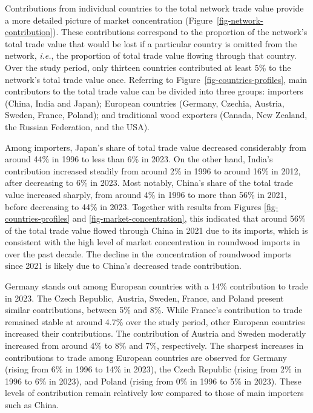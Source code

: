 \documentclass[
  authoryear,
  review,
  3p]{elsarticle}
\begin{document}
Contributions from individual countries to the total network trade value
provide a more detailed picture of market concentration
(Figure~\ref{fig-network-contribution}). These contributions correspond
to the proportion of the network's total trade value that would be lost
if a particular country is omitted from the network, \emph{i.e.}, the
proportion of total trade value flowing through that country. Over the
study period, only thirteen countries contributed at least 5\% to the
network's total trade value once. Referring to
Figure~\ref{fig-countries-profiles}, main contributors to the total
trade value can be divided into three groups: importers (China, India
and Japan); European countries (Germany, Czechia, Austria, Sweden,
France, Poland); and traditional wood exporters (Canada, New Zealand,
the Russian Federation, and the USA).

Among importers, Japan's share of total trade value decreased
considerably from around 44\% in 1996 to less than 6\% in 2023. On the
other hand, India's contribution increased steadily from around 2\% in
1996 to around 16\% in 2012, after decreasing to 6\% in 2023. Most
notably, China's share of the total trade value increased sharply, from
around 4\% in 1996 to more than 56\% in 2021, before decreasing to 44\%
in 2023. Together with results from Figures \ref{fig-countries-profiles}
and \ref{fig-market-concentration}, this indicated that around 56\% of
the total trade value flowed through China in 2021 due to its imports,
which is consistent with the high level of market concentration in
roundwood imports in over the past decade. The decline in the
concentration of roundwood imports since 2021 is likely due to China's
decreased trade contribution.

Germany stands out among European countries with a 14\% contribution to
trade in 2023. The Czech Republic, Austria, Sweden, France, and Poland
present similar contributions, between 5\% and 8\%. While France's
contribution to trade remained stable at around 4.7\% over the study
period, other European countries increased their contributions. The
contribution of Austria and Sweden moderatly increased from around 4\%
to 8\% and 7\%, respectively. The sharpest increases in contributions to
trade among European countries are observed for Germany (rising from 6\%
in 1996 to 14\% in 2023), the Czech Republic (rising from 2\% in 1996 to
6\% in 2023), and Poland (rising from 0\% in 1996 to 5\% in 2023). These
levels of contribution remain relatively low compared to those of main
importers such as China.
\end{document}
